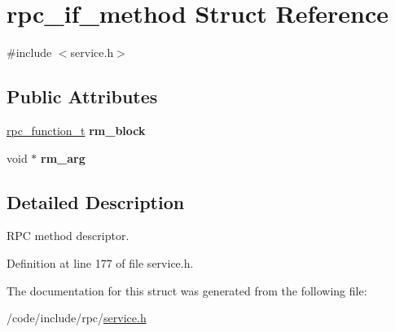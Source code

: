 \hypertarget{structrpc__if__method}{}\section{rpc\+\_\+if\+\_\+method Struct Reference}
\label{structrpc__if__method}


{\ttfamily \#include $<$service.\+h$>$}

\subsection*{Public Attributes}
\begin{DoxyCompactItemize}
\item 
\hyperlink{service_8h_a02d3dbd723de9bd5140887c9935ff05a}{rpc\+\_\+function\+\_\+t} {\bfseries rm\+\_\+block}\hypertarget{structrpc__if__method_ad02bcfe0adc134947ab369c927e307a0}{}\label{structrpc__if__method_ad02bcfe0adc134947ab369c927e307a0}

\item 
void $\ast$ {\bfseries rm\+\_\+arg}\hypertarget{structrpc__if__method_a30f477ae1a1636164e2cc5051deb4fa1}{}\label{structrpc__if__method_a30f477ae1a1636164e2cc5051deb4fa1}

\end{DoxyCompactItemize}


\subsection{Detailed Description}
R\+PC method descriptor. 

Definition at line 177 of file service.\+h.



The documentation for this struct was generated from the following file\+:\begin{DoxyCompactItemize}
\item 
/code/include/rpc/\hyperlink{service_8h}{service.\+h}\end{DoxyCompactItemize}
